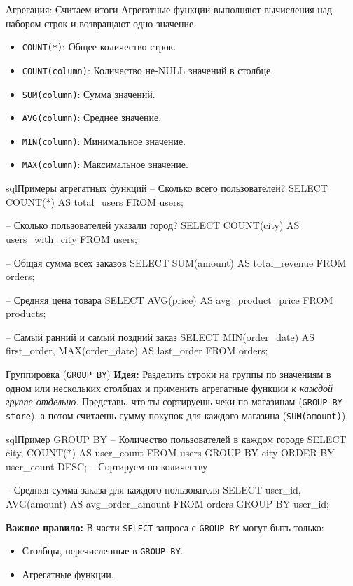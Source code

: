 \begin{myblock}{Агрегация: Считаем итоги}
    Агрегатные функции выполняют вычисления над набором строк и возвращают одно значение.
    \begin{itemize}
        \item \texttt{COUNT(*)}: Общее количество строк.
        \item \texttt{COUNT(column)}: Количество не-NULL значений в столбце.
        \item \texttt{SUM(column)}: Сумма значений.
        \item \texttt{AVG(column)}: Среднее значение.
        \item \texttt{MIN(column)}: Минимальное значение.
        \item \texttt{MAX(column)}: Максимальное значение.
    \end{itemize}
    \begin{codebox}{sql}{Примеры агрегатных функций}
    -- Сколько всего пользователей?
    SELECT COUNT(*) AS total_users FROM users;

    -- Сколько пользователей указали город?
    SELECT COUNT(city) AS users_with_city FROM users;

    -- Общая сумма всех заказов
    SELECT SUM(amount) AS total_revenue FROM orders;

    -- Средняя цена товара
    SELECT AVG(price) AS avg_product_price FROM products;

    -- Самый ранний и самый поздний заказ
    SELECT MIN(order_date) AS first_order, MAX(order_date) AS last_order FROM orders;
    \end{codebox}
\end{myblock}

\begin{textbox}{Группировка (\texttt{GROUP BY})}
    \textbf{Идея:} Разделить строки на группы по значениям в одном или нескольких столбцах и применить агрегатные функции \textit{к каждой группе отдельно}.
    Представь, что ты сортируешь чеки по магазинам (\texttt{GROUP BY store}), а потом считаешь сумму покупок для каждого магазина (\texttt{SUM(amount)}).
    \begin{codebox}{sql}{Пример GROUP BY}
    -- Количество пользователей в каждом городе
    SELECT city, COUNT(*) AS user_count
    FROM users
    GROUP BY city
    ORDER BY user_count DESC; -- Сортируем по количеству

    -- Средняя сумма заказа для каждого пользователя
    SELECT user_id, AVG(amount) AS avg_order_amount
    FROM orders
    GROUP BY user_id;
    \end{codebox}
    \textbf{Важное правило:} В части \texttt{SELECT} запроса с \texttt{GROUP BY} могут быть только:
    \begin{itemize}
        \item Столбцы, перечисленные в \texttt{GROUP BY}.
        \item Агрегатные функции.
    \end{itemize}
\end{textbox}

